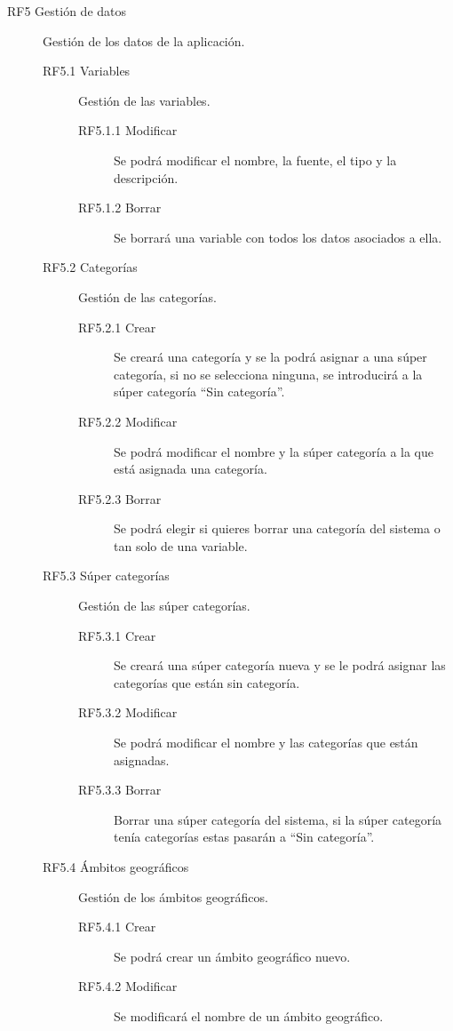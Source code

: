 \begin{description}
    \item [RF5 Gestión de datos] Gestión de los datos de la aplicación.
    \begin{description}
        \item [RF5.1 Variables] Gestión de las variables.
        \begin{description}
            \item [RF5.1.1 Modificar] Se podrá modificar el nombre, la fuente, el tipo y la descripción.
            \item [RF5.1.2 Borrar] Se borrará una variable con todos los datos asociados a ella.
        \end{description}
        \item [RF5.2 Categorías] Gestión de las categorías.
        \begin{description}
            \item [RF5.2.1 Crear] Se creará una categoría y se la podrá asignar a una súper categoría, si no se selecciona ninguna, se introducirá a la súper categoría “Sin categoría”.
            \item [RF5.2.2 Modificar] Se podrá modificar el nombre y la súper categoría a la que está asignada una categoría.
            \item [RF5.2.3 Borrar]  Se podrá elegir si quieres borrar una categoría del sistema o tan solo de una variable.
        \end{description}
        \item [RF5.3 Súper categorías] Gestión de las súper categorías.
        \begin{description}
            \item [RF5.3.1 Crear] Se creará una súper categoría nueva y se le podrá asignar las categorías que están sin categoría.
            \item [RF5.3.2 Modificar] Se podrá modificar el nombre y las categorías que están asignadas.
            \item [RF5.3.3 Borrar] Borrar una súper categoría del sistema, si la súper categoría tenía categorías estas pasarán a “Sin categoría”.
        \end{description}
        \item [RF5.4 Ámbitos geográficos] Gestión de los ámbitos geográficos.
        \begin{description}
            \item [RF5.4.1 Crear] Se podrá crear un ámbito geográfico nuevo.
            \item [RF5.4.2 Modificar] Se modificará el nombre de un ámbito geográfico.

\end{description}
\end{description}
\end{description}
